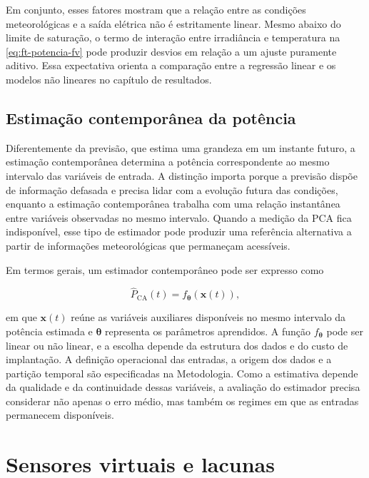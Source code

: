 Em conjunto, esses fatores mostram que a relação entre as condições
meteorológicas e a saída elétrica não é estritamente linear. Mesmo abaixo do
limite de saturação, o termo de interação entre irradiância e temperatura na
\cref{eq:ft-potencia-fv} pode produzir desvios em relação a um ajuste
puramente aditivo. Essa expectativa orienta a comparação entre a regressão
linear e os modelos não lineares no capítulo de resultados.

\subsection{Estimação contemporânea da potência}
\label{subsec:ft-potencia-contemporanea}

Diferentemente da previsão, que estima uma grandeza em um instante
futuro, a estimação contemporânea determina a potência correspondente ao
mesmo intervalo das variáveis de entrada. A distinção importa porque a
previsão dispõe de informação defasada e precisa lidar com a evolução
futura das condições, enquanto a estimação contemporânea trabalha com
uma relação instantânea entre variáveis observadas no mesmo intervalo.
Quando a medição da PCA fica indisponível, esse tipo de estimador pode
produzir uma referência alternativa a partir de informações
meteorológicas que permaneçam acessíveis.

Em termos gerais, um estimador contemporâneo pode ser expresso como

\begin{equation}
\label{eq:ft-funcao-estimacao}
\widehat{P}_{\mathrm{CA}}(t)=f_{\boldsymbol{\theta}}(\mathbf{x}(t)),
\end{equation}

\noindent em que $\mathbf{x}(t)$ reúne as variáveis auxiliares
disponíveis no mesmo intervalo da potência estimada e
$\boldsymbol{\theta}$ representa os parâmetros aprendidos. A função
$f_{\boldsymbol{\theta}}$ pode ser linear ou não linear, e a escolha
depende da estrutura dos dados e do custo de implantação. A definição
operacional das entradas, a origem dos dados e a partição temporal são
especificadas na Metodologia. Como a estimativa depende da qualidade e
da continuidade dessas variáveis, a avaliação do estimador precisa
considerar não apenas o erro médio, mas também os regimes em que as
entradas permanecem disponíveis.

\section{Sensores virtuais e lacunas}
\label{sec:ft-softsensor}

